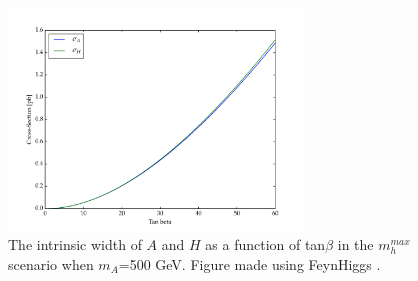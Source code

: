 \begin{figure}
	\centering
	\includegraphics[width=0.7\textwidth]{Theory/figures/TB_gamma.pdf}
	\caption{The intrinsic width of $A$ and $H$ as a function of 
    tan$\beta$ in the $m_h^{max}$ scenario when $m_A$=500 GeV. 
    Figure made using FeynHiggs \cite{feynhiggs_1, feynhiggs_2, feynhiggs_3, feynhiggs_4, feynhiggs_5}. \label{fig:TB_width}}
\end{figure}





